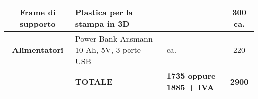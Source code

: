 \begin{table*}
\begin{tabular}{c  L{0.3\textwidth}  L{0.2\textwidth}  c }
\textbf{Frame di supporto} & Plastica per la stampa in 3D &  & 300 ca. \\ \midrule
\textbf{Alimentatori} & Power Bank Ansmann 10 Ah, 5V, 3 porte USB &  ca. & 220 \\ \midrule

&\textbf{TOTALE} & \textbf{ 1735 oppure 1885 + IVA} & \textbf{2900} \\ \bottomrule 
                                            
                                                


\end{tabular}
\end{table*}


